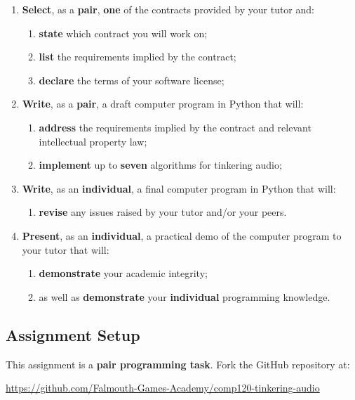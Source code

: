 \documentclass{../../fal_assignment}
\begin{document}
\begin{enumerate}[label=(\Alph*)]
    \item \textbf{Select}, as a \textbf{pair}, \textbf{one} of the contracts provided by your tutor and:
    	\begin{enumerate}[label=\roman*.]
    		\item \textbf{state} which contract you will work on;
    		\item \textbf{list} the requirements implied by the contract;
     		\item \textbf{declare} the terms of your software license;
	\end{enumerate}
    \item \textbf{Write}, as a \textbf{pair}, a draft computer program in Python that will:
    	\begin{enumerate}[label=\roman*.]
    		\item \textbf{address} the requirements implied by the contract and relevant intellectual property law;
    		\item \textbf{implement} up to \textbf{seven} algorithms for tinkering audio;
	\end{enumerate}
    \item \textbf{Write}, as an \textbf{individual}, a final computer program in Python that will:
    	\begin{enumerate}[label=\roman*.]
    		\item \textbf{revise} any issues raised by your tutor and/or your peers.
	\end{enumerate}
    \item \textbf{Present}, as an \textbf{individual}, a practical demo of the computer program to your tutor that will:
    	\begin{enumerate}[label=\roman*.]
    		\item \textbf{demonstrate} your academic integrity;
    		\item as well as \textbf{demonstrate} your \textbf{individual} programming knowledge.
	\end{enumerate}
\end{enumerate}

\subsection*{Assignment Setup}

This assignment is a \textbf{pair programming task}. Fork the GitHub repository at:

\indent \url{https://github.com/Falmouth-Games-Academy/comp120-tinkering-audio}
\end{document}
